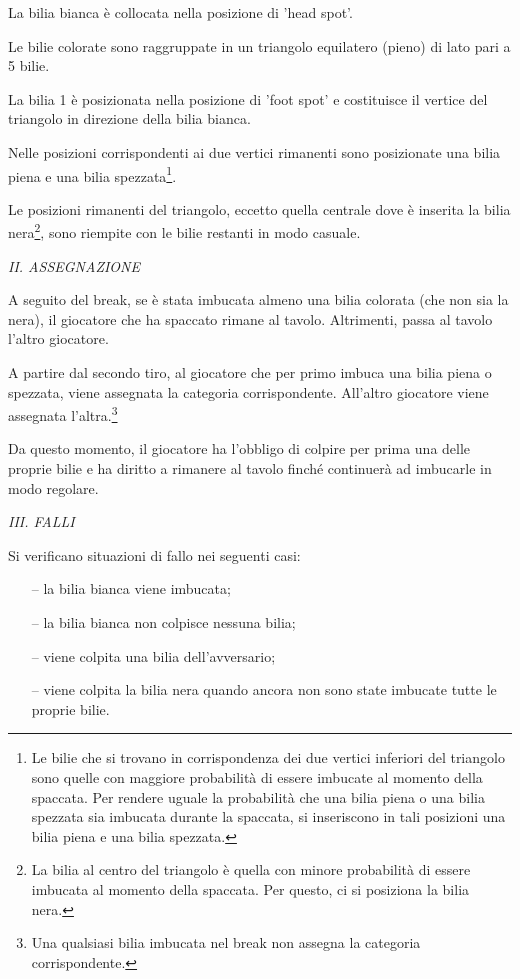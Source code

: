 \documentclass[12pt,a4paper]{report}
\begin{document}
La bilia bianca è collocata nella posizione di 'head spot'.

Le bilie colorate sono raggruppate in un triangolo equilatero (pieno) di lato pari a 5 bilie.

La bilia 1 è posizionata nella posizione di 'foot spot' e costituisce il vertice del triangolo in direzione della bilia bianca.

Nelle posizioni corrispondenti ai due vertici rimanenti sono posizionate una bilia piena e una bilia spezzata\footnote{Le bilie che si trovano in corrispondenza dei due vertici inferiori del triangolo sono quelle con maggiore probabilità di essere imbucate al momento della spaccata. Per rendere uguale la probabilità che una bilia piena o una bilia spezzata sia imbucata durante la spaccata, si inseriscono in tali posizioni una bilia piena e una bilia spezzata.}.

Le posizioni rimanenti del triangolo, eccetto quella centrale dove è inserita la bilia nera\footnote{La bilia al centro del triangolo è quella con minore probabilità di essere imbucata al momento della spaccata. Per questo, ci si posiziona la bilia nera.}, sono riempite con le bilie restanti in modo casuale.

\vspace{9mm}
\noindent \emph{II. ASSEGNAZIONE}

A seguito del break, se è stata imbucata almeno una bilia colorata (che non sia la nera), il giocatore che ha spaccato rimane al tavolo.
Altrimenti, passa al tavolo l'altro giocatore.

A partire dal secondo tiro, al giocatore che per primo imbuca una bilia piena o spezzata, viene assegnata la categoria corrispondente.
All'altro giocatore viene assegnata l'altra.\footnote{Una qualsiasi bilia imbucata nel break non assegna la categoria corrispondente.}

Da questo momento, il giocatore ha l'obbligo di colpire per prima una delle proprie bilie e ha diritto a rimanere al tavolo finché continuerà ad imbucarle in modo regolare.

\vspace{9mm}
\noindent \emph{III. FALLI}

Si verificano situazioni di fallo nei seguenti casi:
\begin{itemize}[noitemsep]
    \item[--]la bilia bianca viene imbucata;
    \item[--] la bilia bianca non colpisce nessuna bilia;
    \item[--] viene colpita una bilia dell'avversario;
    \item[--] viene colpita la bilia nera quando ancora non sono state imbucate tutte le proprie bilie.
\end{itemize}
\end{document}
